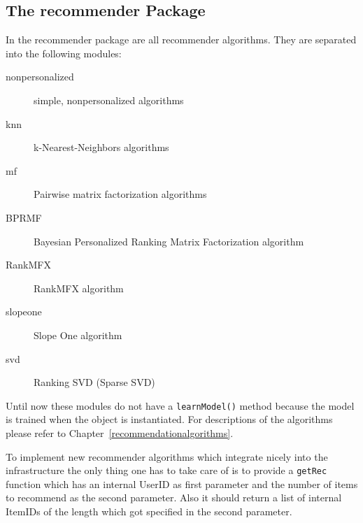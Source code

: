 \subsection*{The recommender Package}
In the recommender package are all recommender algorithms.
They are separated into the following modules:
\begin{description}
\item[nonpersonalized] simple, nonpersonalized algorithms
\item[knn] k-Nearest-Neighbors algorithms
\item[mf] Pairwise matrix factorization algorithms
\item[BPRMF] Bayesian Personalized Ranking Matrix Factorization algorithm
\item[RankMFX] RankMFX algorithm
\item[slopeone] Slope One algorithm
\item[svd] Ranking SVD (Sparse SVD)
\end{description}
Until now these modules do not have a \lstinline!learnModel()! method because the model is trained when the object is instantiated.
For descriptions of the algorithms please refer to Chapter~\ref{recommendationalgorithms}.

To implement new recommender algorithms which integrate nicely into the infrastructure
the only thing one has
to take care of is to provide a \lstinline!getRec! function which has an 
internal UserID as first parameter and the number of items to recommend
as the second parameter. Also it should return a list of internal ItemIDs of the
length which got specified in the second parameter.

